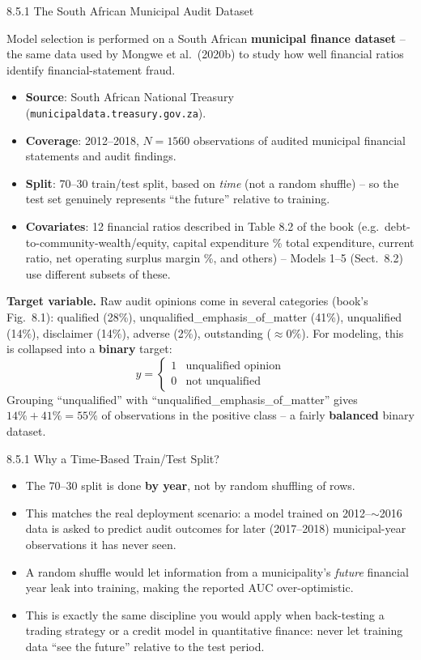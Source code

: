 \documentclass[aspectratio=169,10pt]{beamer}
\begin{document}
\begin{frame}[allowframebreaks]{8.5.1 The South African Municipal Audit Dataset}

Model selection is performed on a South African \textbf{municipal finance dataset} -- the same data used by Mongwe et al.\ (2020b) to study how well financial ratios identify financial-statement fraud.

\begin{itemize}
  \item \textbf{Source}: South African National Treasury (\texttt{municipaldata.treasury.gov.za}).
  \item \textbf{Coverage}: 2012--2018, $N = 1560$ observations of audited municipal financial statements and audit findings.
  \item \textbf{Split}: 70--30 train/test split, based on \emph{time} (not a random shuffle) -- so the test set genuinely represents ``the future'' relative to training.
  \item \textbf{Covariates}: 12 financial ratios described in Table 8.2 of the book (e.g.\ debt-to-community-wealth/equity, capital expenditure \% total expenditure, current ratio, net operating surplus margin \%, and others) -- Models 1--5 (Sect.\ 8.2) use different subsets of these.
\end{itemize}

\framebreak

\textbf{Target variable.} Raw audit opinions come in several categories (book's Fig.\ 8.1): qualified (28\%), unqualified\_emphasis\_of\_matter (41\%), unqualified (14\%), disclaimer (14\%), adverse (2\%), outstanding ($\approx$0\%). For modeling, this is collapsed into a \textbf{binary} target:
\[
y = \begin{cases} 1 & \text{unqualified opinion} \\ 0 & \text{not unqualified} \end{cases}
\]
Grouping ``unqualified'' with ``unqualified\_emphasis\_of\_matter'' gives $14\%+41\%=55\%$ of observations in the positive class -- a fairly \textbf{balanced} binary dataset.

\end{frame}

\begin{frame}{8.5.1 Why a Time-Based Train/Test Split?}
\begin{itemize}
  \item The 70--30 split is done \textbf{by year}, not by random shuffling of rows.
  \item This matches the real deployment scenario: a model trained on 2012--$\sim$2016 data is asked to predict audit outcomes for later (2017--2018) municipal-year observations it has never seen.
  \item A random shuffle would let information from a municipality's \emph{future} financial year leak into training, making the reported AUC over-optimistic.
  \item This is exactly the same discipline you would apply when back-testing a trading strategy or a credit model in quantitative finance: never let training data ``see the future'' relative to the test period.
\end{itemize}
\end{frame}
\end{document}
